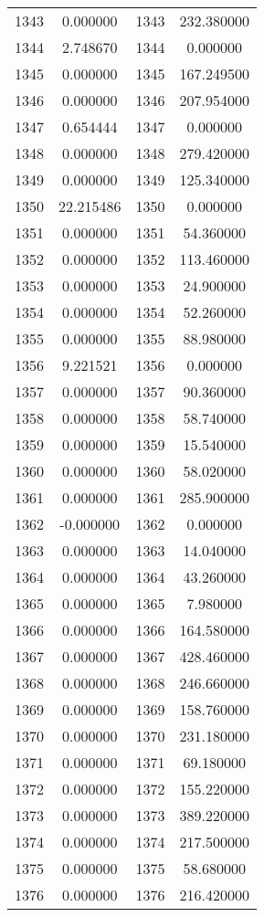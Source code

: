 \documentclass[12pt]{article}
\begin{document}
\begin{longtable}{@{}cccc@{}}
1343 & 0.000000 & 1343 & 232.380000 \\
1344 & 2.748670 & 1344 & 0.000000 \\
1345 & 0.000000 & 1345 & 167.249500 \\
1346 & 0.000000 & 1346 & 207.954000 \\
1347 & 0.654444 & 1347 & 0.000000 \\
1348 & 0.000000 & 1348 & 279.420000 \\
1349 & 0.000000 & 1349 & 125.340000 \\
1350 & 22.215486 & 1350 & 0.000000 \\
1351 & 0.000000 & 1351 & 54.360000 \\
1352 & 0.000000 & 1352 & 113.460000 \\
1353 & 0.000000 & 1353 & 24.900000 \\
1354 & 0.000000 & 1354 & 52.260000 \\
1355 & 0.000000 & 1355 & 88.980000 \\
1356 & 9.221521 & 1356 & 0.000000 \\
1357 & 0.000000 & 1357 & 90.360000 \\
1358 & 0.000000 & 1358 & 58.740000 \\
1359 & 0.000000 & 1359 & 15.540000 \\
1360 & 0.000000 & 1360 & 58.020000 \\
1361 & 0.000000 & 1361 & 285.900000 \\
1362 & -0.000000 & 1362 & 0.000000 \\
1363 & 0.000000 & 1363 & 14.040000 \\
1364 & 0.000000 & 1364 & 43.260000 \\
1365 & 0.000000 & 1365 & 7.980000 \\
1366 & 0.000000 & 1366 & 164.580000 \\
1367 & 0.000000 & 1367 & 428.460000 \\
1368 & 0.000000 & 1368 & 246.660000 \\
1369 & 0.000000 & 1369 & 158.760000 \\
1370 & 0.000000 & 1370 & 231.180000 \\
1371 & 0.000000 & 1371 & 69.180000 \\
1372 & 0.000000 & 1372 & 155.220000 \\
1373 & 0.000000 & 1373 & 389.220000 \\
1374 & 0.000000 & 1374 & 217.500000 \\
1375 & 0.000000 & 1375 & 58.680000 \\
1376 & 0.000000 & 1376 & 216.420000 \\

\end{longtable}
\end{document}
